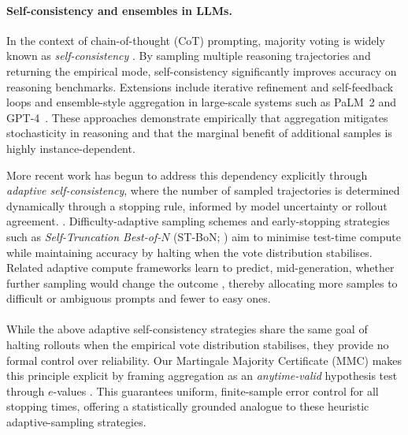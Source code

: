\documentclass{article} %
\begin{document}
\paragraph{Self-consistency and ensembles in LLMs.}  
In the context of chain-of-thought (CoT) prompting, majority voting is widely known as \emph{self-consistency} \citep{wang2022selfconsistency}.
By sampling multiple reasoning trajectories and returning the empirical mode, self-consistency significantly improves accuracy on reasoning benchmarks.  Extensions include iterative refinement and self-feedback loops
\citep{madaan2023selfrefine,shinn2023reflexion} and ensemble-style aggregation in large-scale systems such as PaLM~2 \citep{anil2023palm} and GPT-4~\citep{openai2023gpt4}.
These approaches demonstrate empirically that aggregation mitigates stochasticity in reasoning and that the marginal benefit of additional samples is highly instance-dependent.

More recent work has begun to address this dependency explicitly through
\emph{adaptive self-consistency}, where the number of sampled trajectories is
determined dynamically through a stopping rule, informed by model uncertainty or rollout agreement. \citep{aggarwal2023let,liescape, wan2025reasoning}.   
Difficulty-adaptive sampling schemes
\citep{wang2025make}
and early-stopping strategies such as
\emph{Self-Truncation Best-of-$N$} (ST-BoN; \cite{wang2025sampling})
aim to minimise test-time compute while maintaining accuracy by
halting when the vote distribution stabilises.
Related adaptive compute frameworks learn to predict, mid-generation, whether
further sampling would change the outcome
\citep{manvi2024adaptive,liu2024speculative,chen2024ee},
thereby allocating more samples to difficult or ambiguous prompts and fewer to easy ones.
\\\\
While the above adaptive self-consistency strategies share the same goal of
halting rollouts when the empirical vote distribution stabilises, they provide no formal
control over reliability.  Our Martingale Majority Certificate (MMC) makes this
principle explicit by framing aggregation as an \emph{anytime-valid} hypothesis
test through $e$-values \citep{STA-002}.  This guarantees uniform, finite-sample error control for all stopping times,
offering a statistically grounded analogue to these heuristic adaptive-sampling
strategies.
\end{document}
